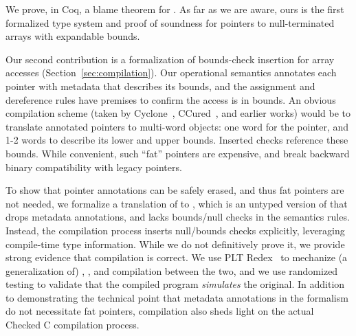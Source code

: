 We prove, in Coq, a blame theorem for \lang.  As far as we are aware,
ours is the first formalized type system and proof of soundness for
pointers to null-terminated arrays with expandable bounds.


 Our second
contribution is a formalization of bounds-check insertion for array
accesses (Section~\ref{sec:compilation}). Our operational semantics
annotates each pointer with metadata that describes its bounds, and
the assignment and dereference rules have premises to confirm the
access is in bounds. An obvious compilation scheme (taken by
Cyclone~\cite{Jim2002,GrossmanMJHWC02}, CCured~\cite{Necula2005}, and
earlier works) would be to translate annotated pointers to multi-word
objects: one word for the pointer, and 1-2 words to describe its lower
and upper bounds. Inserted checks reference these bounds. While
convenient, such ``fat'' pointers are expensive, and break backward
binary compatibility with legacy pointers.

  To show that pointer annotations can be safely
  erased, and thus fat pointers are not needed, we formalize a
  translation of \lang to \elang, which is an 
  untyped version of \lang that drops metadata annotations, and
  lacks bounds/null checks in the semantics rules. Instead,
  the compilation process inserts null/bounds checks explicitly, leveraging
  compile-time type information. While we do not definitively prove
  it, we provide strong evidence that compilation is correct. We use PLT
  Redex~\cite{pltredex} to mechanize (a generalization of) \lang, 
  \elang, and compilation between the two, and we use randomized testing 
to validate that the compiled program \emph{simulates} the
original. In addition to demonstrating the technical point that metadata
annotations in the \lang formalism do not necessitate fat pointers,
compilation also sheds light on the actual Checked C compilation
process. 

